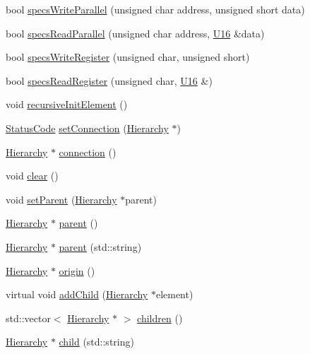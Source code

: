 \begin{DoxyCompactItemize}
\item 
bool \hyperlink{classSpecsInterface_a232c39e46091c493ad9d061428dd2a8b}{specsWriteParallel} (unsigned char address, unsigned short data)
\item 
bool \hyperlink{classSpecsInterface_aefbe6b92a9f9e2f00bf41dd8b2605c05}{specsReadParallel} (unsigned char address, \hyperlink{LSDelayChipV1_8h_adf928e51a60dba0df29d615401cc55a8}{U16} \&data)
\item 
bool \hyperlink{classSpecsInterface_ab70adfa5ad87097469c7485126a3c61a}{specsWriteRegister} (unsigned char, unsigned short)
\item 
bool \hyperlink{classSpecsInterface_a87080bb575d1b9d0bb313c48e7d3f59a}{specsReadRegister} (unsigned char, \hyperlink{LSDelayChipV1_8h_adf928e51a60dba0df29d615401cc55a8}{U16} \&)
\item 
void \hyperlink{classElement_a3c0abcb36f8906688bb7e32608df7086}{recursiveInitElement} ()
\item 
\hyperlink{classStatusCode}{StatusCode} \hyperlink{classElement_ab476b4b1df5954141ceb14f072433b89}{setConnection} (\hyperlink{classHierarchy}{Hierarchy} $\ast$)
\item 
\hyperlink{classHierarchy}{Hierarchy} $\ast$ \hyperlink{classElement_af57444353c1ddf9fa0109801e97debf7}{connection} ()
\item 
void \hyperlink{classHierarchy_af4d43b0765b402670eed2d62c73405af}{clear} ()
\item 
void \hyperlink{classHierarchy_a585ad1aeec16077a0e532ab8b4fc557b}{setParent} (\hyperlink{classHierarchy}{Hierarchy} $\ast$parent)
\item 
\hyperlink{classHierarchy}{Hierarchy} $\ast$ \hyperlink{classHierarchy_a1c7bec8257e717f9c1465e06ebf845fc}{parent} ()
\item 
\hyperlink{classHierarchy}{Hierarchy} $\ast$ \hyperlink{classHierarchy_ad550588733bf75ac5c0fcfd7c8fd11a6}{parent} (std::string)
\item 
\hyperlink{classHierarchy}{Hierarchy} $\ast$ \hyperlink{classHierarchy_aee461dc930ce3871636ff87f075b1b83}{origin} ()
\item 
virtual void \hyperlink{classHierarchy_ad677774ff38fcb257c04a3a10d471fac}{addChild} (\hyperlink{classHierarchy}{Hierarchy} $\ast$element)
\item 
std::vector$<$ \hyperlink{classHierarchy}{Hierarchy} $\ast$ $>$ \hyperlink{classHierarchy_aa9a76f69e98e052ee1a6e32cea006288}{children} ()
\item 
\hyperlink{classHierarchy}{Hierarchy} $\ast$ \hyperlink{classHierarchy_a1e207f973c694b538bf90107b4868817}{child} (std::string)

\end{DoxyCompactItemize}

